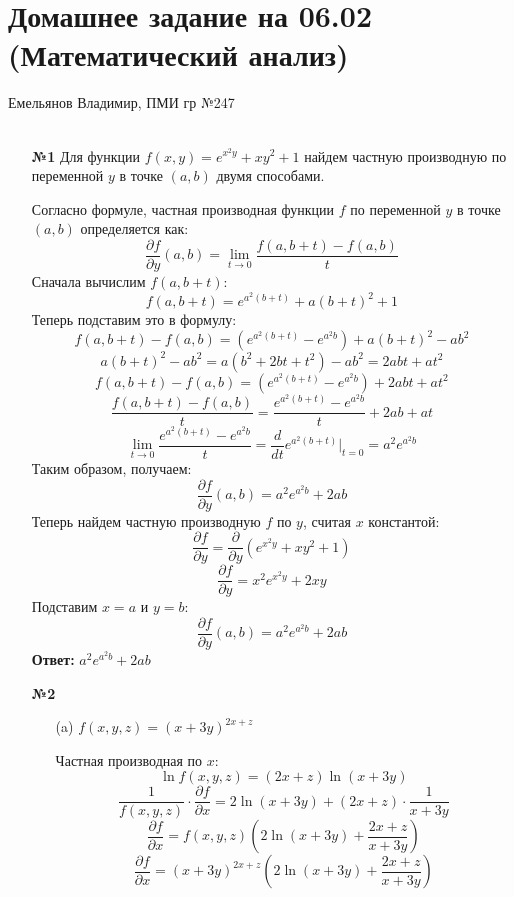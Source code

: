 \documentclass[a4paper]{article}
\begin{document}
\section*{Домашнее задание на 06.02 (Математический анализ)}
 {\large Емельянов Владимир, ПМИ гр №247}\\\\
\begin{enumerate}
    \item[\textbf{№1}]Для функции $ f(x, y) = e^{x^2 y} + x y^2 + 1 $
     найдем частную производную по переменной $ y $ в точке $ (a, b) $ двумя способами.
    
    Согласно формуле, частная производная функции $ f $ по переменной $ y $ 
    в точке $ (a, b) $ определяется как:
    $$
    \frac{\partial f}{\partial y}(a, b) = \lim_{t \to 0} \frac{f(a, b + t) - f(a, b)}{t}
    $$
    Сначала вычислим $ f(a, b + t) $:
    $$
    f(a, b + t) = e^{a^2 (b + t)} + a (b + t)^2 + 1
    $$
    Теперь подставим это в формулу:
    $$
    f(a, b + t) - f(a, b) = \left( e^{a^2 (b + t)} - e^{a^2 b} \right) + a (b + t)^2 - a b^2
    $$
    $$
    a (b + t)^2 - a b^2 = a (b^2 + 2bt + t^2) - a b^2 = 2ab t + at^2
    $$
    $$
    f(a, b + t) - f(a, b) = \left( e^{a^2 (b + t)} - e^{a^2 b} \right) + 2ab t + at^2
    $$
    $$
    \frac{f(a, b + t) - f(a, b)}{t} = \frac{e^{a^2 (b + t)} - e^{a^2 b}}{t} + 2ab + at
    $$
    $$
    \lim_{t \to 0} \frac{e^{a^2 (b + t)} - e^{a^2 b}}{t} = \frac{d}{dt} e^{a^2 (b + t)} \bigg|_{t=0} = a^2 e^{a^2 b}
    $$
    Таким образом, получаем:
    $$
    \frac{\partial f}{\partial y}(a, b) = a^2 e^{a^2 b} + 2ab
    $$
    Теперь найдем частную производную $ f $ по $ y $, считая $ x $ константой:
    $$
    \frac{\partial f}{\partial y} = \frac{\partial}{\partial y} \left( e^{x^2 y} + x y^2 + 1 \right)
    $$
    $$
    \frac{\partial f}{\partial y} = x^2 e^{x^2 y} + 2xy
    $$
    Подставим $ x = a $ и $ y = b $:
    $$
    \frac{\partial f}{\partial y}(a, b) = a^2 e^{a^2 b} + 2ab
    $$
    \textbf{Ответ:} $ a^2 e^{a^2 b} + 2ab$

    \item[\textbf{№2}]\begin{enumerate}
        \item[(a)]$ f(x, y, z) = (x + 3y)^{2x + z} $
        
        Частная производная по $ x $:
        \[
        \ln f(x, y, z) = (2x + z) \ln(x + 3y)
        \]
        \[
        \frac{1}{f(x, y, z)} \cdot \frac{\partial f}{\partial x} = 2 \ln(x + 3y) + (2x + z) \cdot \frac{1}{x + 3y}
        \]
        \[
        \frac{\partial f}{\partial x} = f(x, y, z) \left( 2 \ln(x + 3y) + \frac{2x + z}{x + 3y} \right)
        \]
        \[
        \frac{\partial f}{\partial x} = (x + 3y)^{2x + z} \left( 2 \ln(x + 3y) + \frac{2x + z}{x + 3y} \right)
        \]


\end{enumerate}
\end{enumerate}
\end{document}
